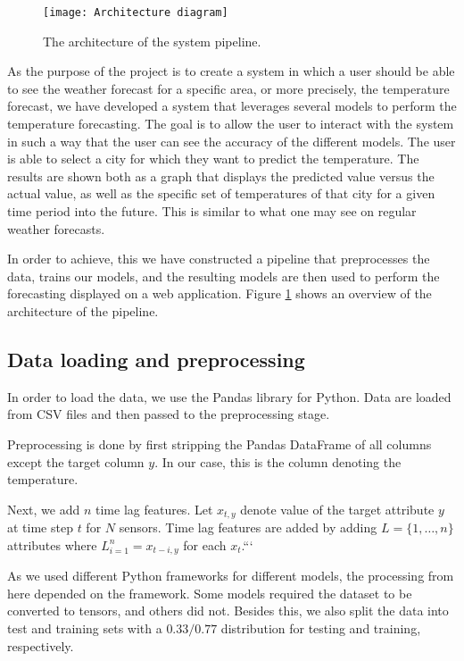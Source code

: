 \begin{figure}[h]
	\centering
	\texttt{[image: Architecture diagram]}
	\caption{The architecture of the system pipeline.}
	\label{fig:architecture diagram}
\end{figure}

As the purpose of the project is to create a system in which a user should be able to see the weather forecast for a specific area, or more precisely, the temperature forecast, we have developed a system that leverages several models to perform the temperature forecasting. 
The goal is to allow the user to interact with the system in such a way that the user can see the accuracy of the different models. 
The user is able to select a city for which they want to predict the temperature. The results are shown both as a graph that displays the predicted value versus the actual value, as well as the specific set of temperatures of that city for a given time period into the future. This is similar to what one may see on regular weather forecasts.

In order to achieve, this we have constructed a pipeline that preprocesses the data, trains our models, and the resulting models are then used to perform the forecasting displayed on a web application. 
Figure \ref{fig:architecture diagram} shows an overview of the architecture of the pipeline.


\subsection{Data loading and preprocessing}
In order to load the data, we use the Pandas library for Python.
Data are loaded from CSV files and then passed to the preprocessing stage.

Preprocessing is done by first stripping the Pandas DataFrame of all columns except the target column $y$. In our case, this is the column denoting the temperature.

Next, we add $n$ time lag features. Let $x_{t,y}$ denote value of the target attribute $y$ at time step $t$ for $N$ sensors. 
Time lag features are added by adding $L=\{1,\dots, n\}$ attributes where $L_{i=1}^n=x_{t-i, y}$ for each $x_{t}$.```

As we used different Python frameworks for different models, the processing from here depended on the framework. Some models required the dataset to be converted to tensors, and others did not.
Besides this, we also split the data into test and training sets with a $0.33/0.77$ distribution for testing and training, respectively.
